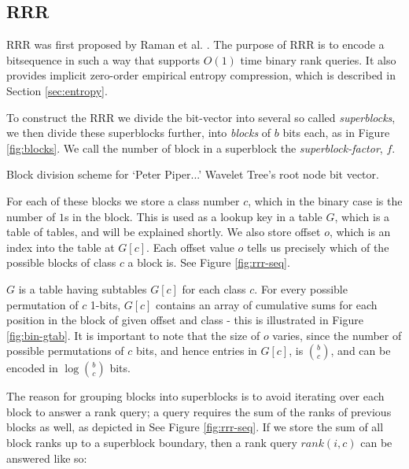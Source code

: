 






\subsection{RRR}
\label{sec:rrr}
RRR was first proposed by Raman et al. \cite{raman2007}. The purpose of RRR is to
encode a bitsequence in such a way that supports $O(1)$ time binary rank 
queries. It also provides implicit zero-order empirical entropy compression, 
which is described in Section \ref{sec:entropy}.

To construct the RRR we divide the bit-vector into several so called 
\emph{superblocks}, we then divide these superblocks further, into 
\emph{blocks} of $b$ bits each, as in Figure \ref{fig:blocks}. We call the 
number of block in a superblock the \emph{superblock-factor}, $f$.

			{Block division scheme for `Peter Piper...' Wavelet Tree's root
			node bit vector.}

For each of these blocks we store a class number $c$, which in the binary case 
is the number of  $1$s in the block. This is used as a lookup key in a table 
$G$, which is a table of tables, and will be explained shortly. We also store 
offset $o$, which is an index into the table at $G[c]$. Each offset value $o$ 
tells us precisely which of the possible blocks of class $c$ a block is. See 
Figure \ref{fig:rrr-seq}.

$G$ is a table having subtables $G[c]$ for each class $c$. For every possible 
permutation of $c$ 1-bits, $G[c]$ contains an array of cumulative sums for each 
position in the block of given offset and class - this is illustrated in Figure \ref{fig:bin-gtab}. It is important to note that 
the size of $o$ varies, since the number of possible permutations of $c$ bits, 
and hence entries in $G[c]$, is $b \choose c$, and can be encoded in $\log {b 
\choose c}$ bits.

The reason for grouping blocks into superblocks is to avoid iterating over each
block to answer a rank query; a query requires the sum of the ranks of previous
blocks as well, as depicted in See Figure \ref{fig:rrr-seq}. If we store the sum 
of all block ranks up to a superblock boundary, then a rank query $rank(i, c)$ 
can be answered like so:

